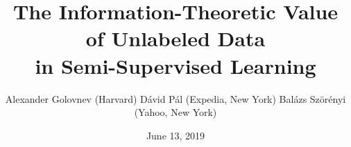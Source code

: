 \documentclass[30pt,landscape]{sciposter}
\begin{document}
\renewcommand{\thefootnote}{\fnsymbol{footnote}}
\renewcommand{\footlogo}{Typeset by pdf\LaTeX}
\renewcommand{\algorithmicrequire}{\textbf{Input:}}

\title{The Information-Theoretic Value of Unlabeled Data \\ in Semi-Supervised Learning}
\author{Alexander Golovnev (Harvard) \qquad \qquad D\'avid P\'al (Expedia, New York) \qquad \qquad Bal\'azs Sz\"or\'enyi (Yahoo, New York)}

\date{June 13, 2019}


\maketitle
\end{document}
